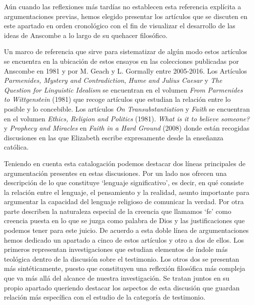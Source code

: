 Aún cuando las reflexiones más tardías no establecen esta referencia explícita a argumentaciones previas, hemos elegido presentar los artículos que se discuten en este apartado en orden cronológico con el fin de visualizar el desarrollo de las ideas de Anscombe a lo largo de su quehacer filosófico. 

Un marco de referencia que sirve para sistematizar de algún modo estos artículos se encuentra en la ubicación de estos ensayos en las colecciones publicadas por Anscombe en 1981 y por M. Geach y L. Gormally entre 2005-2016. Los Artículos \emph{Parmenides, Mystery and Contradiction}, \emph{Hume and Julius Caesar} y \emph{The Question for Linguistic Idealism} se encuentran en el volumen \emph{From Parmenides to Wittgenstein} (1981) que recoge artículos que estudian la relación entre lo posible y lo concebible. Los artículos \emph{On Transubstantiation} y \emph{Faith} se encuentran en el volumen \emph{Ethics, Religion and Politics} (1981). \emph{What is it to believe someone?} y \emph{Prophecy and Miracles} en \emph{Faith in a Hard Ground} (2008) donde están recogidas discusiones en las que Elizabeth escribe expresamente desde la enseñanza católica. 

Teniendo en cuenta esta catalogación podemos destacar dos líneas principales de argumentación presentes en estas discusiones. Por un lado nos ofrecen una descripción de lo que constituye `lenguaje significativo', es decir, en qué consiste la relación entre el lenguaje, el pensamiento y la realidad, asunto importante para argumentar la capacidad del lenguaje religioso de comunicar la verdad. Por otra parte describen la naturaleza especial de la creencia que llamamos `fe' como creencia puesta en lo que se juzga como palabra de Dios y las justificaciones que podemos tener para este juicio. De acuerdo a esta doble línea de argumentaciones hemos dedicado un apartado a cinco de estos artículos y otro a dos de ellos. Los primeros representan investigaciones que estudian elementos de índole más teológica dentro de la discusión sobre el testimonio. Los otros dos se presentan más sintéticamente, puesto que constituyen una reflexión filosófica más compleja que va más allá del alcance de nuestra investigación. Se tratan juntos en su propio apartado queriendo destacar los aspectos de esta discusión que guardan relación más específica con el estudio de la categoría de testimonio.
